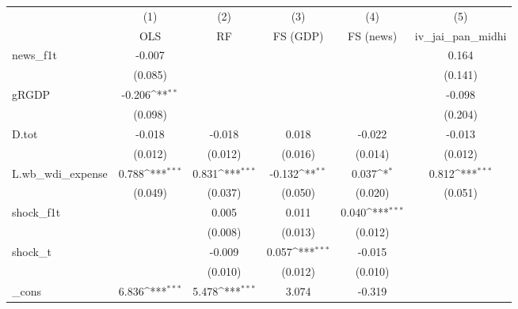 {
\def\sym#1{\ifmmode^{#1}\else\(^{#1}\)\fi}
\begin{tabular}{l*{5}{c}}
\toprule
            &\multicolumn{1}{c}{(1)}&\multicolumn{1}{c}{(2)}&\multicolumn{1}{c}{(3)}&\multicolumn{1}{c}{(4)}&\multicolumn{1}{c}{(5)}\\
            &\multicolumn{1}{c}{OLS}&\multicolumn{1}{c}{RF}&\multicolumn{1}{c}{FS (GDP)}&\multicolumn{1}{c}{FS (news)}&\multicolumn{1}{c}{iv\_jai\_pan\_midhi}\\
\midrule
news\_f1t    &      -0.007         &                     &                     &                     &       0.164         \\
            &     (0.085)         &                     &                     &                     &     (0.141)         \\
\addlinespace
gRGDP       &      -0.206\sym{**} &                     &                     &                     &      -0.098         \\
            &     (0.098)         &                     &                     &                     &     (0.204)         \\
\addlinespace
D.tot       &      -0.018         &      -0.018         &       0.018         &      -0.022         &      -0.013         \\
            &     (0.012)         &     (0.012)         &     (0.016)         &     (0.014)         &     (0.012)         \\
\addlinespace
L.wb\_wdi\_expense&       0.788\sym{***}&       0.831\sym{***}&      -0.132\sym{**} &       0.037\sym{*}  &       0.812\sym{***}\\
            &     (0.049)         &     (0.037)         &     (0.050)         &     (0.020)         &     (0.051)         \\
\addlinespace
shock\_f1t   &                     &       0.005         &       0.011         &       0.040\sym{***}&                     \\
            &                     &     (0.008)         &     (0.013)         &     (0.012)         &                     \\
\addlinespace
shock\_t     &                     &      -0.009         &       0.057\sym{***}&      -0.015         &                     \\
            &                     &     (0.010)         &     (0.012)         &     (0.010)         &                     \\
\addlinespace
\_cons      &       6.836\sym{***}&       5.478\sym{***}&       3.074         &      -0.319         &                     \\

\end{tabular}}

